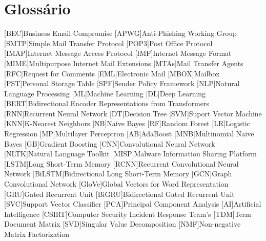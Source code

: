 \chapter{Glossário}

\footnotesize
\SingleSpacing

\begin{multicols}{2}
\begin{acronym}[AAAAAA]

	[BEC]{Business Email Compromise}
    [APWG]{Anti-Phishing Working Group}
	[SMTP]{Simple Mail Transfer Protocol}
	[POP3]{Post Office Protocol}
	[IMAP]{Internet Message Access Protocol}
	[IMF]{Internet Message Format}
	[MIME]{Multipurpose Internet Mail Extensions}
	[MTAs]{Mail Transfer Agents}
	[RFC]{Request for Comments}
	[EML]{Electronic Mail}
	[MBOX]{Mailbox}
	[PST]{Personal Storage Table}
	[SPF]{Sender Policy Framework}
	[NLP]{Natural Language Processing}
	[ML]{Machine Learning}
	[DL]{Deep Learning}
	[BERT]{Bidirectional Encoder Representations from Transformers}
	[RNN]{Recurrent Neural Network}
	[DT]{Decision Tree}
	[SVM]{Suport Vector Machine}
	[KNN]{K-Nearest Neighbors}
	[NB]{Naive Bayes}
	[RF]{Random Forest}
	[LR]{Logistic Regression}
	[MP]{Multilayer Perceptron}
	[AB]{AdaBoost}
	[MNB]{Multinomial Naive Bayes}
	[GB]{Gradient Boosting}
	[CNN]{Convolutional Neural Network}
	[NLTK]{Natural Language Toolkit}
	[MISP]{Malware Information Sharing Platform}
	[LSTM]{Long Short-Term Memory}
	[RCNN]{Recurrent Convolutional Neural Network}
	[BiLSTM]{Bidirectional Long Short-Term Memory}
	[GCN]{Graph Convolutional Network}
	[GloVe]{Global Vectors for Word Representation}
	[GRU]{Gated Recurrent Unit}
	[BiGRU]{Bidirectional Gated Recurrent Unit}
	[SVC]{Support Vector Classifier}
	[PCA]{Principal Component Analysis}
	[AI]{Artificial Intelligence}
	[CSIRT]{Computer Security Incident Response Team's}
	[TDM]{Term Document Matrix}
	[SVD]{Singular Value Decomposition}
	[NMF]{Non-negative Matrix Factorization}

\end{acronym}
\end{multicols}

